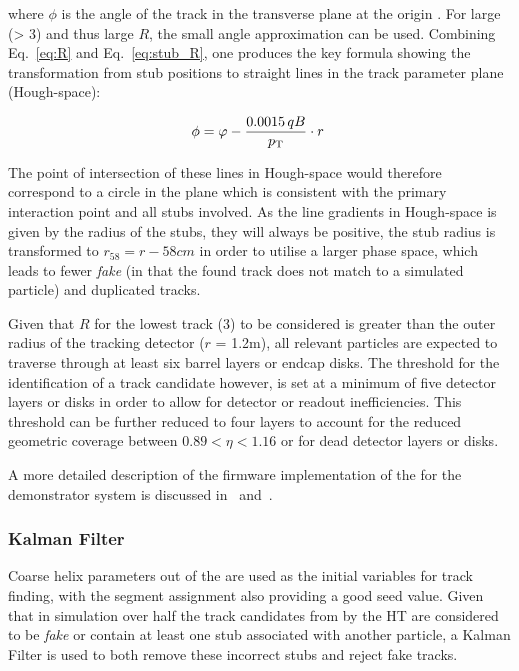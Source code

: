 where $\phi$ is the angle of the track in the transverse plane at the origin \cite{markthesis}. 
For large \pT (> 3\GeV) and thus large $R$, the small angle approximation can be used. Combining Eq.~\ref{eq:R} and Eq.~\ref{eq:stub_R}, one produces the key formula showing the transformation from stub positions to straight lines in the track parameter plane (Hough-space):

\begin{equation}
\phi = \varphi - \frac{0.0015\,qB}{p_{\mathrm{T}}}\cdot r \;
\label{eq:localHT}
\end{equation}

The point of intersection of these lines in Hough-space would therefore correspond to a circle in the \rphi plane which is consistent with the primary interaction point and all stubs involved.
As the line gradients in Hough-space is given by the radius of the stubs, they will always be positive, the stub radius is transformed to $r_{58} = r - 58cm$ in order to utilise a larger phase space, which leads to fewer \textit{fake} (in that the found track does not match to a simulated particle) and duplicated tracks.

Given that $R$ for the lowest \pT track (3\GeV) to be considered is greater than the outer radius of the tracking detector ($r$ = 1.2m), all relevant particles are expected to traverse through at least six barrel layers or endcap disks. 
The threshold for the identification of a track candidate however, is set at a minimum of five detector layers or disks in order to allow for detector or readout inefficiencies. 
This threshold can be further reduced to four layers to account for the reduced geometric coverage between $0.89 < \eta < 1.16$ or for dead detector layers or disks.

A more detailed description of the firmware implementation of the \HT for the demonstrator system is discussed in~\cite{IEEE} and~\cite{TMTT_JINST}.

\subsubsection{Kalman Filter}\label{subsubsec:KF}
Coarse \rphi helix parameters out of the \HT are used as the initial variables for track finding, with the segment assignment also providing a good seed value.
Given that in simulation over half the track candidates from by the HT are considered to be \textit{fake} or contain at least one stub associated with another particle, a Kalman Filter is used to both remove these incorrect stubs and reject fake tracks. 

